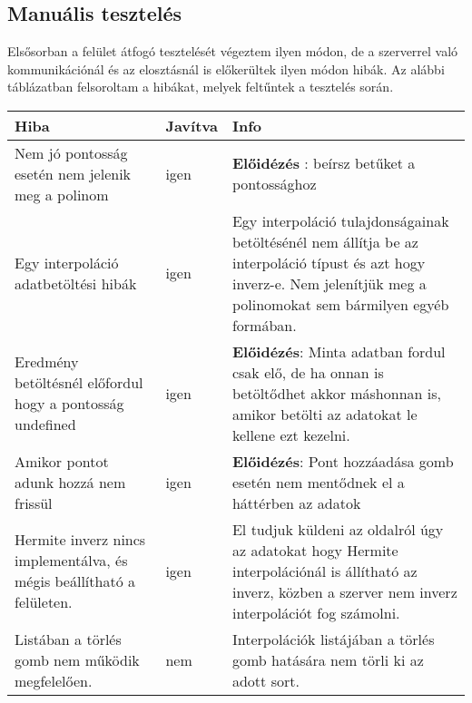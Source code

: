 \subsection{Manuális tesztelés}
	Elsősorban a felület átfogó tesztelését végeztem ilyen módon, de a szerverrel való kommunikációnál és az elosztásnál is előkerültek ilyen módon hibák. \newline
	Az alábbi táblázatban felsoroltam a hibákat, melyek feltűntek a tesztelés során. 
	\begin{center}
  	\begin{tabular}{| p{4cm} | p{1.5cm} | p{8cm} |}
    \hline
    Hiba & Javítva & Info
  	\\ \hline
        Nem jó pontosság esetén nem jelenik meg a polinom
      &
      	igen
      &
		\textbf{Előidézés} : beírsz betűket a pontossághoz 
    \\ \hline
        Egy interpoláció adatbetöltési hibák
      &
      	igen
      &
      	Egy interpoláció tulajdonságainak betöltésénél nem állítja be az interpoláció típust és azt hogy inverz-e.
      	Nem jelenítjük meg a polinomokat sem bármilyen egyéb formában.
    \\ \hline
        Eredmény betöltésnél előfordul hogy a pontosság undefined 
      &
      	igen
      &
		\textbf{Előidézés}:  Minta adatban fordul csak elő, de ha onnan  is betöltődhet akkor máshonnan is, amikor betölti az adatokat le kellene ezt kezelni.
   \\ \hline
    	Amikor pontot adunk hozzá nem frissül 
      &
      	igen
      &
		\textbf{Előidézés}: Pont hozzáadása gomb esetén nem mentődnek el a háttérben az adatok
    \\ \hline
    	Hermite inverz nincs implementálva, és mégis beállítható a felületen.  
      &
      	igen
      &
		El tudjuk küldeni az oldalról úgy az adatokat hogy Hermite interpolációnál is állítható az inverz, közben a szerver nem inverz interpolációt fog számolni.
	\\ \hline
    	Listában a törlés gomb nem működik megfelelően.    
      &
      	nem
      &
		Interpolációk listájában a törlés gomb hatására nem törli ki az adott sort. 
	\\ \hline
  \end{tabular}\end{center}
